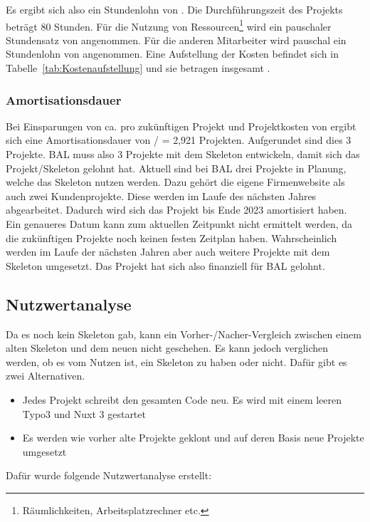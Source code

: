 Es ergibt sich also ein Stundenlohn von . 
Die Durchführungszeit des Projekts beträgt 80 Stunden. Für die Nutzung von Ressourcen\footnote{Räumlichkeiten, Arbeitsplatzrechner etc.} wird 
ein pauschaler Stundensatz von  angenommen. Für die anderen Mitarbeiter wird pauschal ein Stundenlohn von  angenommen. 
Eine Aufstellung der Kosten befindet sich in Tabelle~\ref{tab:Kostenaufstellung} und sie betragen insgesamt .


\subsubsection{Amortisationsdauer}
\label{sec:Amortisationsdauer}

Bei Einsparungen von ca.  pro zukünftigen Projekt und Projektkosten von  ergibt sich eine Amortisationsdauer von  /  = 2,921 Projekten. Aufgerundet sind dies 3 Projekte. \acs{BAL} muss also 3 Projekte mit dem Skeleton entwickeln, damit sich das Projekt/Skeleton gelohnt hat. Aktuell sind bei \acs{BAL} drei Projekte in Planung, welche das Skeleton nutzen werden. Dazu gehört die eigene Firmenwebsite als auch zwei Kundenprojekte. Diese werden im Laufe des nächsten Jahres abgearbeitet. Dadurch wird sich das Projekt bis Ende 2023 amortisiert haben. Ein genaueres Datum kann zum aktuellen Zeitpunkt nicht ermittelt werden, da die zukünftigen Projekte noch keinen festen Zeitplan haben. Wahrscheinlich werden im Laufe der nächsten Jahren aber auch weitere Projekte mit dem Skeleton umgesetzt. Das Projekt hat sich also finanziell für \acs{BAL} gelohnt.


\subsection{Nutzwertanalyse}
\label{sec:Nutzwertanalyse}
Da es noch kein Skeleton gab, kann ein Vorher-/Nacher-Vergleich zwischen einem alten Skeleton und dem neuen nicht geschehen. Es kann jedoch verglichen werden, ob es vom Nutzen ist, ein Skeleton zu haben oder nicht. Dafür gibt es zwei Alternativen.
\begin{itemize}
	\item Jedes Projekt schreibt den gesamten Code neu. Es wird mit einem leeren Typo3 und Nuxt 3 gestartet
	\item Es werden wie vorher alte Projekte geklont und auf deren Basis neue Projekte umgesetzt
\end{itemize}
Dafür wurde folgende Nutzwertanalyse erstellt: \newline

